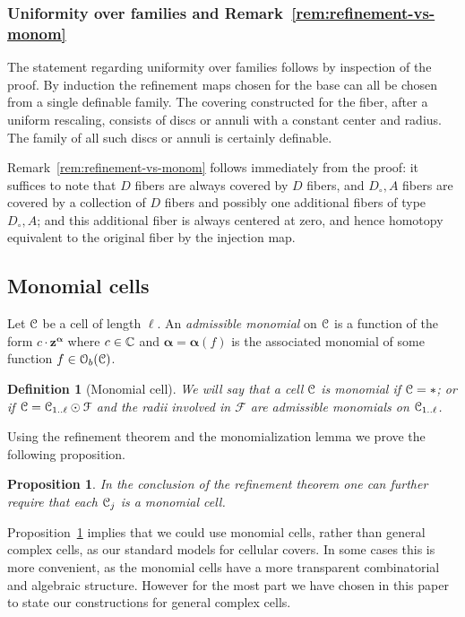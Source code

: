 \documentclass[reqno]{amsart}
\newtheorem{Prop}[Cor]{Proposition}{\bfseries}{\itshape}
\newtheorem{Def}[Cor]{Definition}{\bfseries}{\rmfamily}
\renewcommand\~[1]{\widetilde{#1}}
\def\cF{{\mathcal F}} \def\cL{{\mathcal L}} \def\cR{{\mathcal R}}
\def\cO{{\mathcal O}}
\def\vz{{\mathbf z}}
\def\valpha{{\boldsymbol\alpha}}
\begin{document}
\subsubsection{Uniformity over families and Remark~\ref{rem:refinement-vs-monom}}

The statement regarding uniformity over families follows by inspection
of the proof. By induction the refinement maps chosen for the base can
all be chosen from a single definable family. The covering constructed
for the fiber, after a uniform rescaling, consists of discs or annuli
with a constant center and radius. The family of all such discs or
annuli is certainly definable.

Remark~\ref{rem:refinement-vs-monom} follows immediately from the
proof: it suffices to note that $D$ fibers are always covered by $D$
fibers, and $D_\circ,A$ fibers are covered by a collection of $D$
fibers and possibly one additional fibers of type $D_\circ,A$; and
this additional fiber is always centered at zero, and hence homotopy
equivalent to the original fiber by the injection map.

\subsection{Monomial cells}

Let ${\mathcal C}$ be a cell of length $\ell$. An \emph{admissible monomial} on
${\mathcal C}$ is a function of the form $c\cdot\vz^\valpha$ where $c\in{\mathbb C}$ and
$\valpha=\valpha(f)$ is the associated monomial of some function
$f\in\cO_b(\cC)$.

\begin{Def}[Monomial cell]
  We will say that a cell ${\mathcal C}$ is \emph{monomial} if ${\mathcal C}=*$; or if
  $\cC=\cC_{1..\ell}\odot\cF$ and the radii involved in $\cF$ are
  admissible monomials on ${\mathcal C}_{1..\ell}$.
\end{Def}

Using the refinement theorem and the monomialization lemma we prove
the following proposition.

\begin{Prop}\label{prop:monomial-cover}
  In the conclusion of the refinement theorem one can further require
  that each ${\mathcal C}_j$ is a monomial cell.
\end{Prop}

Proposition~\ref{prop:monomial-cover} implies that we could use
monomial cells, rather than general complex cells, as our standard
models for cellular covers. In some cases this is more convenient, as
the monomial cells have a more transparent combinatorial and algebraic
structure. However for the most part we have chosen in this paper to
state our constructions for general complex cells. 
\end{document}
